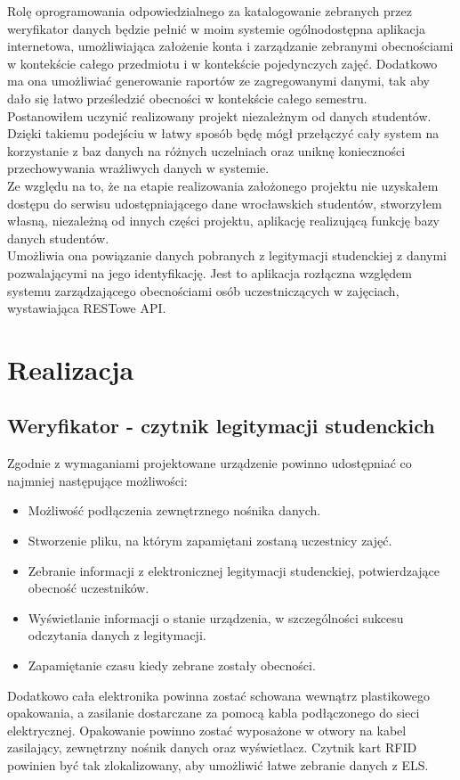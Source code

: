 \documentclass[declaration,shortabstract, mgr]{iithesis}
\begin{document}
\indent Rolę oprogramowania odpowiedzialnego za katalogowanie zebranych przez weryfikator danych będzie pełnić w moim systemie ogólnodostępna aplikacja internetowa, umożliwiająca założenie konta i zarządzanie zebranymi obecnościami w kontekście całego przedmiotu i w kontekście pojedynczych zajęć. Dodatkowo ma ona umożliwiać generowanie raportów ze zagregowanymi danymi, tak aby dało się łatwo prześledzić obecności w kontekście całego semestru. \\
\indent Postanowiłem uczynić realizowany projekt niezależnym od danych studentów. Dzięki takiemu podejściu w łatwy sposób będę mógł przełączyć cały system na korzystanie z baz danych na różnych uczelniach oraz uniknę konieczności przechowywania wrażliwych danych w systemie. \\
\indent Ze względu na to, że na etapie realizowania założonego projektu nie uzyskałem dostępu do serwisu udostępniającego dane wrocławskich studentów, stworzyłem własną, niezależną od innych części projektu, aplikację realizującą funkcję bazy danych studentów. \\
\indent Umożliwia ona powiązanie danych pobranych z legitymacji studenckiej z danymi pozwalającymi na jego identyfikację. Jest to aplikacja rozłączna względem systemu zarządzającego obecnościami osób uczestniczących w zajęciach, wystawiająca RESTowe API.

\chapter{Realizacja}
\section{Weryfikator - czytnik legitymacji studenckich}
\indent Zgodnie z wymaganiami projektowane urządzenie powinno udostępniać co najmniej następujące możliwości:
\begin{itemize}
\item Możliwość podłączenia zewnętrznego nośnika danych.
\item Stworzenie pliku, na którym zapamiętani zostaną uczestnicy zajęć.
\item Zebranie informacji z elektronicznej legitymacji studenckiej, potwierdzające obecność uczestników.
\item Wyświetlanie informacji o stanie urządzenia, w szczególności sukcesu odczytania danych z legitymacji.
\item Zapamiętanie czasu kiedy zebrane zostały obecności.
\end{itemize}
\indent Dodatkowo cała elektronika powinna zostać schowana wewnątrz plastikowego opakowania, a zasilanie dostarczane za pomocą kabla podłączonego do sieci elektrycznej. Opakowanie powinno zostać wyposażone w otwory na kabel zasilający, zewnętrzny nośnik danych oraz wyświetlacz. Czytnik kart RFID powinien być tak zlokalizowany, aby umożliwić łatwe zebranie danych z ELS.
\end{document}
